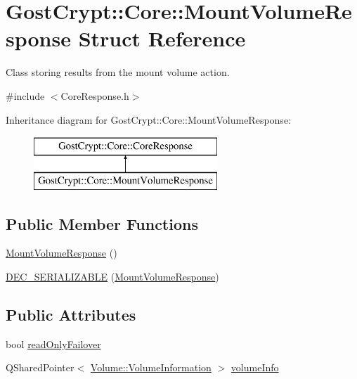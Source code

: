 \hypertarget{struct_gost_crypt_1_1_core_1_1_mount_volume_response}{}\section{Gost\+Crypt\+:\+:Core\+:\+:Mount\+Volume\+Response Struct Reference}
\label{struct_gost_crypt_1_1_core_1_1_mount_volume_response}


Class storing results from the mount volume action.  




{\ttfamily \#include $<$Core\+Response.\+h$>$}

Inheritance diagram for Gost\+Crypt\+:\+:Core\+:\+:Mount\+Volume\+Response\+:\begin{figure}[H]
\begin{center}
\leavevmode
\includegraphics[height=2.000000cm]{struct_gost_crypt_1_1_core_1_1_mount_volume_response}
\end{center}
\end{figure}
\subsection*{Public Member Functions}
\begin{DoxyCompactItemize}
\item 
\hyperlink{struct_gost_crypt_1_1_core_1_1_mount_volume_response_ac8c9a78313be273e5eb3d71ffd02f559}{Mount\+Volume\+Response} ()
\item 
\hyperlink{struct_gost_crypt_1_1_core_1_1_mount_volume_response_a48c85341b4a05df5edcd5a2c1c1e726e}{D\+E\+C\+\_\+\+S\+E\+R\+I\+A\+L\+I\+Z\+A\+B\+LE} (\hyperlink{struct_gost_crypt_1_1_core_1_1_mount_volume_response}{Mount\+Volume\+Response})
\end{DoxyCompactItemize}
\subsection*{Public Attributes}
\begin{DoxyCompactItemize}
\item 
bool \hyperlink{struct_gost_crypt_1_1_core_1_1_mount_volume_response_ac4729de73299e91d62aabfc1d1d4501b}{read\+Only\+Failover}
\item 
Q\+Shared\+Pointer$<$ \hyperlink{struct_gost_crypt_1_1_volume_1_1_volume_information}{Volume\+::\+Volume\+Information} $>$ \hyperlink{struct_gost_crypt_1_1_core_1_1_mount_volume_response_a10c9eefc55df712ef0aa342016444299}{volume\+Info}
\end{DoxyCompactItemize}


